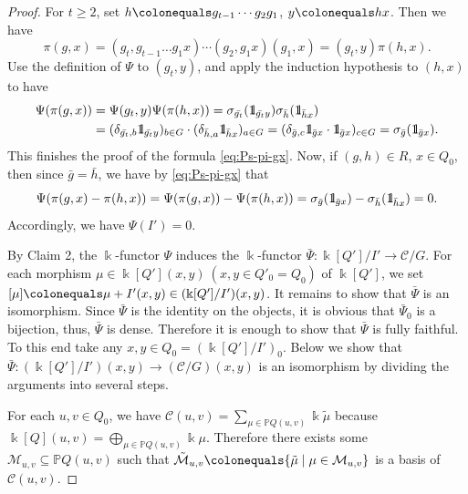 \documentclass{surv-l}
\numberwithin{equation}{chapter}
\numberwithin{figure}{chapter}
\theoremstyle{plain}
\theoremstyle{definition}
\theoremstyle{remark}
\newcommand{\id}{1\kern-.25em{\text{{\rm l}}}}
\begin{document}
\begin{proof}
For $t \ge 2$, set $h\colonequals  g_{t-1}\cdots g_2 g_1$, $y\colonequals  hx$.
Then we have
\begin{equation*}
\pi(g, x) = (g_t, g_{t-1}\dots g_1x)\cdots (g_2,g_1x)(g_1,x)= (g_t, y)\pi(h, x).
\end{equation*}
Use the definition of $\Psi$ to $(g_t, y)$, and apply the induction hypothesis
to $(h, x)$ to have
\begin{equation*}
\begin{aligned}
\Psi(\pi(g, x)) &= \Psi(g_t, y) \Psi(\pi(h, x))
= \sigma_{\bar{g_t}}(\id_{\bar{g_t}y})\sigma_{\bar{h}}(\id_{\bar{h}x})\\
&= (\delta_{\bar{g_t},b}\id_{\bar{g_t}y})_{b\in G}\cdot (\delta_{\bar{h},a}\id_{\bar{h}x})_{a\in G}
= (\delta_{\bar{g},c} \id_{\bar{g}x}\cdot \id_{\bar{g}x})_{c \in G} = \sigma_{\bar{g}}(\id_{\bar{g}x}).
\end{aligned}
\end{equation*}
This finishes the proof of the formula \eqref{eq:Ps-pi-gx}.
Now, if $(g,h) \in R$, $x \in Q_0$, then
since $\bar{g} = \bar{h}$, we have by \eqref{eq:Ps-pi-gx} that
\begin{equation*}
\Psi(\pi(g,x)-\pi(h,x)) = \Psi(\pi(g,x))-\Psi(\pi(h,x))
= \sigma_{\bar{g}}(\id_{\bar{g}x}) - \sigma_{\bar{h}}(\id_{\bar{h}x}) = 0.
\end{equation*}
Accordingly, we have $\Psi(I')=0$.

By Claim 2, the $\Bbbk$-functor $\Psi$ induces the $\Bbbk$-functor
$\bar{\Psi}\colon \Bbbk[Q']/I' \to {\mathcal{C}}/G$.
For each morphism $\mu \in \Bbbk[Q'](x, y)\ (x, y \in Q'_0 = Q_0)$ of $\Bbbk[Q']$,
we set $[\mu]\colonequals  \mu + I'(x, y) \in (\Bbbk[Q']/I')(x, y)$.
It remains to show that $\bar{\Psi}$ is an isomorphism.
Since $\bar{\Psi}$ is the identity on the objects,
it is obvious that $\bar{\Psi}_0$ is a bijection,
thus, $\bar{\Psi}$ is dense. Therefore it is enough to show that $\bar{\Psi}$ is fully faithful.
To this end take any $x, y \in Q_0 = (\Bbbk[Q']/I')_0$.
Below we show that
$
\bar{\Psi}\colon (\Bbbk[Q']/I')(x, y) \to ({\mathcal{C}}/G)(x, y)$
is an isomorphism by dividing the arguments into several steps.

For each $u, v \in Q_0$, we have
${\mathcal{C}}(u, v) = \sum_{\mu \in \mathbb{P} Q(u,v)} \Bbbk \tilde{\mu}$
because $\Bbbk[Q](u, v) = \bigoplus_{\mu \in \mathbb{P} Q(u,v)} \Bbbk \mu$.
Therefore there exists some $\mathcal{M}_{u,v} \subseteq \mathbb{P} Q(u, v)$ such that
$\tilde{\mathcal{M}}_{u,v}\colonequals  \{\tilde{\mu} \mid \mu \in \mathcal{M}_{u,v}\}$
is a basis of ${\mathcal{C}}(u, v)$.


\end{proof}
\end{document}

